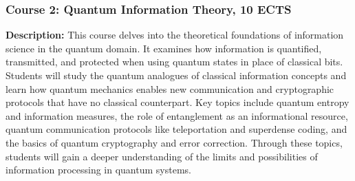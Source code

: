 \documentclass{scrreprt}
\begin{document}
\begin{comment}
    \textbf{Key Topics:}
\begin{itemize}
\item Qubits and quantum states; representation of information in two-level quantum systems (Bloch sphere, state vectors, Dirac notation).
\item Quantum logic gates and the circuit model of computation; universal gate sets and circuit complexity.
\item Representative quantum algorithms (Deutsch-Jozsa, Bernstein-Vazirani, Grover’s search, Shor’s factoring, Quantum Fourier Transform) and their applications.
\item Basics of quantum computational complexity theory (notions of oracle algorithms, BQP vs. classical complexity classes, quantum supremacy concept).
\item Introduction to quantum error correction (simple codes like bit-flip and phase-flip codes, Shor’s code) and the effects of decoherence on computational reliability.
\item Practical quantum programming and experimentation using simulators or cloud-based quantum processors (writing and executing small quantum circuits).
\end{itemize}
\end{comment}
\subsubsection{Course 2: Quantum Information Theory, 10 ECTS}

\textbf{Description:} This course delves into the theoretical foundations of information science in the quantum domain. It examines how information is quantified, transmitted, and protected when using quantum states in place of classical bits. Students will study the quantum analogues of classical information concepts and learn how quantum mechanics enables new communication and cryptographic protocols that have no classical counterpart. Key topics include quantum entropy and information measures, the role of entanglement as an informational resource, quantum communication protocols like teleportation and superdense coding, and the basics of quantum cryptography and error correction. Through these topics, students will gain a deeper understanding of the limits and possibilities of information processing in quantum systems.
\end{document}
